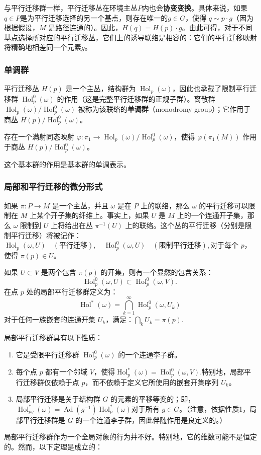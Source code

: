与平行迁移群一样，平行迁移丛在环境主丛\(P\)内也会\textbf{协变变换}。具体来说，如果\(q \in P\)是为平行迁移选择的另一个基点，则存在唯一的\(g \in G\)，使得 \(q \sim p \cdot g\)（因为根据假设，\(M\) 是路径连通的）。因此，\(H(q) = H(p) \cdot g\)。由此可得，对于不同基点选择所对应的平行迁移丛，它们上的诱导联络是相容的：它们的平行迁移映射将精确地相差同一个元素\(g\)。
\subsubsection{单调群}  
平行迁移丛 \(H(p)\) 是一个主丛，结构群为 \(\operatorname{Hol}_p(\omega)\)，因此也承载了限制平行迁移群 \(\operatorname{Hol}_p^0(\omega)\) 的作用（这是完整平行迁移群的正规子群）。离散群 \(\operatorname{Hol}_p(\omega)/\operatorname{Hol}_p^0(\omega)\) 被称为该联络的\textbf{单调群}（monodromy group）；它作用于商丛 \(H(p)/\operatorname{Hol}_p^0(\omega)\)。  

存在一个满射同态映射 \(\varphi : \pi_1 \to \operatorname{Hol}_p(\omega)/\operatorname{Hol}_p^0(\omega)\)，使得 \(\varphi(\pi_1(M))\) 作用于商丛 \(H(p)/\operatorname{Hol}_p^0(\omega)\)。  

这个基本群的作用是基本群的单调表示。
\subsubsection{局部和平行迁移的微分形式} 
如果 \(\pi: P \to M\) 是一个主丛，并且 \(\omega\) 是在 \(P\) 上的联络，那么 \(\omega\) 的平行迁移可以限制在 \(M\) 上某个开子集的纤维上。事实上，如果 \(U\) 是 \(M\) 上的一个连通开子集，那么 \(\omega\) 限制到 \(U\) 上将给出在丛 \(\pi^{-1}(U)\) 上的联络。这个丛的平行迁移（分别是限制平行迁移）将被记作：\(\operatorname{Hol}_p(\omega, U)\quad (\text{平行迁移}),\quad \operatorname{Hol}_p^0(\omega, U) \quad (\text{限制平行迁移}),\)对于每个 \(p\)，使得 \(\pi(p) \in U\)。

如果 \(U \subset V\) 是两个包含 \(\pi(p)\) 的开集，则有一个显然的包含关系：
\[
\operatorname{Hol}_p^0(\omega, U) \subset \operatorname{Hol}_p^0(\omega, V).~
\]
在点 \(p\) 处的局部平行迁移群定义为：
\[
\operatorname{Hol}^*(\omega) = \bigcap_{k=1}^{\infty} \operatorname{Hol}_p^0(\omega, U_k)~
\]
对于任何一族嵌套的连通开集 \(U_k\)，满足：\(\bigcap_k U_k = \pi(p)\).

局部平行迁移群具有以下性质：
\begin{enumerate}
\item 它是受限平行迁移群 \(\operatorname{Hol}_p^0(\omega)\) 的一个连通李子群。
   
\item 每个点 \(p\) 都有一个邻域 \(V\)，使得\(\operatorname{Hol}_p^*(\omega) = \operatorname{Hol}_p^0(\omega, V)\).特别地，局部平行迁移群仅依赖于点 \(p\)，而不依赖于定义它所使用的嵌套开集序列 \(U_k\)。
\item 局部平行迁移是关于结构群 \(G\) 的元素的平移等变的；即，\(\operatorname{Hol}_{pg}^*(\omega) = \operatorname{Ad}(g^{-1}) \operatorname{Hol}_p^*(\omega)\)对于所有 \(g \in G\)。（注意，依据性质1，局部平行迁移群是 \(G\) 的一个连通李子群，因此伴随作用是良定义的。）
\end{enumerate}
局部平行迁移群作为一个全局对象的行为并不好。特别地，它的维数可能不是恒定的。然而，以下定理是成立的：

